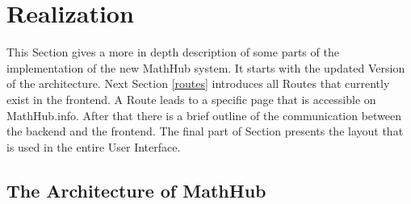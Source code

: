 \documentclass[11pt,a4paper]{article}
\begin{document}
\section{Realization} \label{architecture}
This Section gives a more in depth description of some parts of the implementation of the new MathHub system.
It starts with the updated Version of the architecture.
Next Section \ref{routes} introduces all Routes that currently exist in the frontend.
A Route leads to a specific page that is accessible on MathHub.info.
After that there is a brief outline of the communication between the backend and the frontend. 
The final part of Section presents the layout that is used in the entire User Interface.
\subsection{The Architecture of MathHub}
\end{document}
